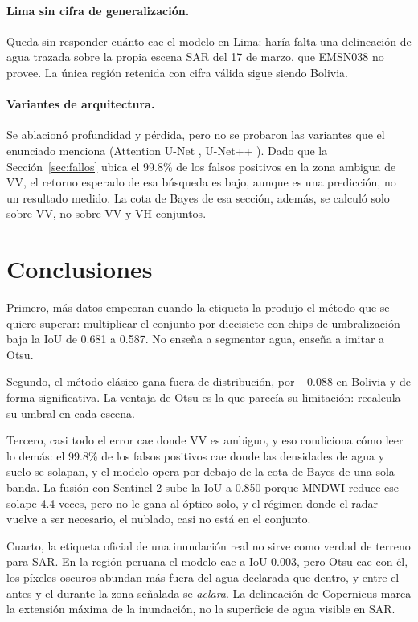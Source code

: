 \documentclass{article}
\begin{document}
\paragraph{Lima sin cifra de generalización.}
Queda sin responder cuánto cae el modelo en Lima: haría falta una delineación de
agua trazada sobre la propia escena SAR del 17 de marzo, que EMSN038 no provee.
La única región retenida con cifra válida sigue siendo Bolivia.

\paragraph{Variantes de arquitectura.}
Se ablacionó profundidad y pérdida, pero no se probaron las variantes que el
enunciado menciona (Attention U-Net \citep{oktay2018attention}, U-Net++
\citep{zhou2018unetpp}). Dado que la Sección~\ref{sec:fallos} ubica el 99.8\% de
los falsos positivos en la zona ambigua de VV, el retorno esperado de esa
búsqueda es bajo, aunque es una predicción, no un resultado medido. La cota de
Bayes de esa sección, además, se calculó solo sobre VV, no sobre VV y VH
conjuntos.

\section{Conclusiones}

Primero, más datos empeoran cuando la etiqueta la produjo el método que
se quiere superar: multiplicar el conjunto por diecisiete con chips de
umbralización baja la IoU de 0.681 a 0.587. No enseña a segmentar agua, enseña a
imitar a Otsu.

Segundo, el método clásico gana fuera de distribución, por $-0.088$ en
Bolivia y de forma significativa. La ventaja de Otsu es la que parecía su
limitación: recalcula su umbral en cada escena.

Tercero, casi todo el error cae donde VV es ambiguo, y eso condiciona
cómo leer lo demás: el 99.8\% de los falsos positivos cae donde las densidades de
agua y suelo se solapan, y el modelo opera por debajo de la cota de Bayes de una
sola banda. La fusión con Sentinel-2 sube la IoU a 0.850 porque MNDWI reduce ese
solape 4.4 veces, pero no le gana al óptico solo, y el régimen donde el radar
vuelve a ser necesario, el nublado, casi no está en el conjunto.

Cuarto, la etiqueta oficial de una inundación real no sirve como verdad
de terreno para SAR. En la región peruana el modelo cae a IoU 0.003, pero Otsu
cae con él, los píxeles oscuros abundan más fuera del agua declarada que dentro,
y entre el antes y el durante la zona señalada se \emph{aclara}. La delineación
de Copernicus marca la extensión máxima de la inundación, no la superficie de
agua visible en SAR.
\end{document}
